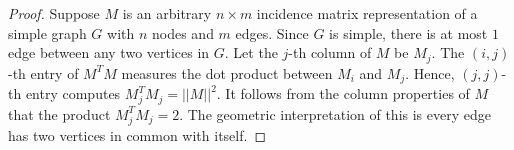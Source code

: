 \documentclass{article}
\begin{document}
\begin{proof}
Suppose $M$ is an arbitrary $n \times m$ incidence matrix representation of a simple graph $G$ with $n$ nodes and $m$ edges. Since $G$ is simple, there is at most $1$ edge between any two vertices in $G$. Let the $j$-th column of $M$ be $M_j$. The $(i,j)$-th entry of $M^TM$ measures the dot product between $M_i$ and $M_j$. Hence, $(j,j)$-th entry computes $M^T_jM_j= ||M||^2$. It follows from the column properties of $M$ that the product $M^T_jM_j = 2$. The geometric interpretation of this is every edge has two vertices in common with itself.


\end{proof}
\end{document}
